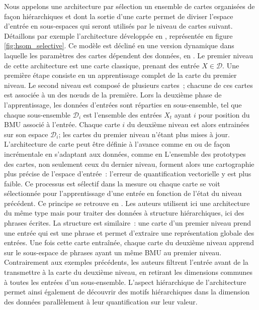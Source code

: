 \documentclass[../main]{subfiles}
\begin{document}
Nous appelons une architecture par sélection un ensemble de cartes organisées de façon hiérarchiques et dont la sortie d'une carte permet de diviser l'espace d'entrée en sous-espaces qui seront utilisés par le niveau de cartes suivant.
Détaillons par exemple l'architecture développée en \cite{barbalho_hierarchical_2001}, représentée en figure \ref{fig:hsom_selective}. Ce modèle est décliné en une version dynamique dans laquelle les paramètres des cartes dépendent des données, en \cite{Costa2016ANS}.
Le premier niveau de cette architecture est une carte classique, prenant des entrée $X \in \mathcal{D}$.
Une première étape consiste en un apprentissage complet de la carte du premier niveau.
Le second niveau est composé de plusieurs cartes~; chacune de ces cartes est associée à un des n\oe{}uds de la première.
Lors la deuxième phase de l'apprentissage, les données d'entrées sont réparties en sous-ensemble, tel que chaque sous-ensemble $\mathcal{D}_i$ est l'ensemble des entrées $X_t$ ayant $i$ pour position du BMU associé à l'entrée.
Chaque carte $i$ du deuxième niveau est alors entrainées sur son espace $\mathcal{D}_i$; les cartes du premier niveau n'étant plus mises à jour.
L'architecture de carte peut être définie à l'avance comme en \cite{barbalho_hierarchical_2001} ou de façon incrémentale en s'adaptant aux données, comme en \cite{Costa2016ANS} 
L'ensemble des prototypes des cartes, non seulement ceux du dernier niveau, forment alors une cartographie plus précise de l'espace d'entrée~: l'erreur de quantification vectorielle y est plus faible.
Ce processus est sélectif dans la mesure ou chaque carte se voit sélectionnée pour l'apprentissage d'une entrée en fonction de l'état du niveau précédent.
Ce principe se retrouve en \cite{miikkulainen_script_1992}. 
Les auteurs utilisent ici une architecture du même type mais pour traiter des données à structure hiérarchiques, ici des phrases écrites. La structure est similaire~: une carte d'un premier niveau prend une entrée qui est une phrase et permet d'extraire une représentation globale des entrées. Une fois cette carte entraînée, chaque carte du deuxième niveau apprend sur le sous-espace de phrases ayant un même BMU au premier niveau. Contrairement aux exemples précédents, les auteurs filtrent l'entrée avant de la transmettre à la carte du deuxième niveau, en retirant les dimensions communes à toutes les entrées d'un sous-ensemble. L'aspect hiérarchique de l'architecture permet ainsi également de découvrir des motifs hiérarchiques dans la dimension des données parallèlement à leur quantification sur leur valeur.
\end{document}
